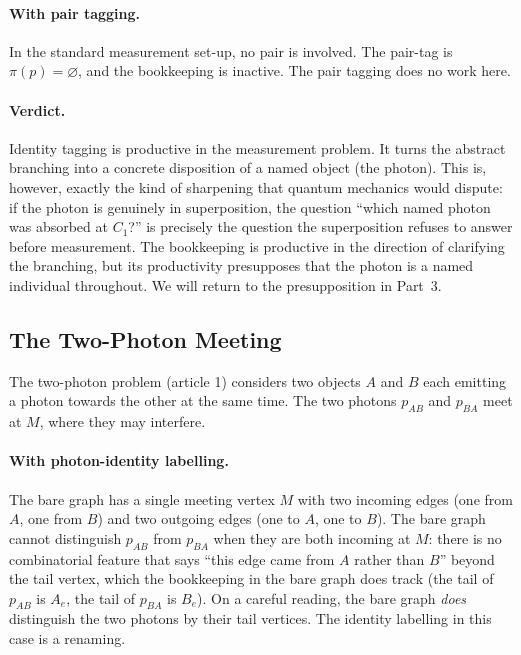 \documentclass[11pt]{article}
\begin{document}
\paragraph{With pair tagging.} In the standard measurement set-up, no pair is involved. The pair-tag is $\pi(p) = \varnothing$, and the bookkeeping is inactive. The pair tagging does no work here.

\paragraph{Verdict.} Identity tagging is productive in the measurement problem. It turns the abstract branching into a concrete disposition of a named object (the photon). This is, however, exactly the kind of sharpening that quantum mechanics would dispute: if the photon is genuinely in superposition, the question ``which named photon was absorbed at $C_1$?'' is precisely the question the superposition refuses to answer before measurement. The bookkeeping is productive in the direction of clarifying the branching, but its productivity presupposes that the photon is a named individual throughout. We will return to the presupposition in Part~3.

\subsection{The Two-Photon Meeting}

The two-photon problem (article 1) considers two objects $A$ and $B$ each emitting a photon towards the other at the same time. The two photons $p_{AB}$ and $p_{BA}$ meet at $M$, where they may interfere.

\paragraph{With photon-identity labelling.} The bare graph has a single meeting vertex $M$ with two incoming edges (one from $A$, one from $B$) and two outgoing edges (one to $A$, one to $B$). The bare graph cannot distinguish $p_{AB}$ from $p_{BA}$ when they are both incoming at $M$: there is no combinatorial feature that says ``this edge came from $A$ rather than $B$'' beyond the tail vertex, which the bookkeeping in the bare graph does track (the tail of $p_{AB}$ is $A_e$, the tail of $p_{BA}$ is $B_e$). On a careful reading, the bare graph \emph{does} distinguish the two photons by their tail vertices. The identity labelling in this case is a renaming.
\end{document}
